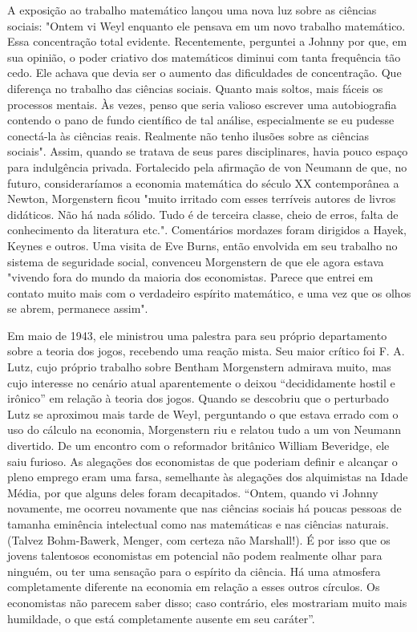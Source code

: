 \documentclass[12pt]{article}
\begin{document}
A exposição ao trabalho matemático lançou uma nova luz sobre as ciências sociais: "Ontem vi Weyl enquanto ele pensava em um novo trabalho matemático. Essa concentração total evidente. Recentemente, perguntei a Johnny por que, em sua opinião, o poder criativo dos matemáticos diminui com tanta frequência tão cedo. Ele achava que devia ser o aumento das dificuldades de concentração. Que diferença no trabalho das ciências sociais. Quanto mais soltos, mais fáceis os processos mentais. Às vezes, penso que seria valioso escrever uma autobiografia contendo o pano de fundo científico de tal análise, especialmente se eu pudesse conectá-la às ciências reais. Realmente não tenho ilusões sobre as ciências sociais". Assim, quando se tratava de seus pares disciplinares, havia pouco espaço para indulgência privada. Fortalecido pela afirmação de von Neumann de que, no futuro, consideraríamos a economia matemática do século XX contemporânea a Newton, Morgenstern ficou "muito irritado com esses terríveis autores de livros didáticos. Não há nada sólido. Tudo é de terceira classe, cheio de erros, falta de conhecimento da literatura etc.". Comentários mordazes foram dirigidos a Hayek, Keynes e outros. Uma visita de Eve Burns, então envolvida em seu trabalho no sistema de seguridade social, convenceu Morgenstern de que ele agora estava "vivendo fora do mundo da maioria dos economistas. Parece que entrei em contato muito mais com o verdadeiro espírito matemático, e uma vez que os olhos se abrem, permanece assim".

Em maio de 1943, ele ministrou uma palestra para seu próprio departamento sobre a teoria dos jogos, recebendo uma reação mista. Seu maior crítico foi F. A. Lutz, cujo próprio trabalho sobre Bentham Morgenstern admirava muito, mas cujo interesse no cenário atual aparentemente o deixou “decididamente hostil e irônico” em relação à teoria dos jogos. Quando se descobriu que o perturbado Lutz se aproximou mais tarde de Weyl, perguntando o que estava errado com o uso do cálculo na economia, Morgenstern riu e relatou tudo a um von Neumann divertido. De um encontro com o reformador britânico William Beveridge, ele saiu furioso. As alegações dos economistas de que poderiam definir e alcançar o pleno emprego eram uma farsa, semelhante às alegações dos alquimistas na Idade Média, por que alguns deles foram decapitados. “Ontem, quando vi Johnny novamente, me ocorreu novamente que nas ciências sociais há poucas pessoas de tamanha eminência intelectual como nas matemáticas e nas ciências naturais. (Talvez Bohm-Bawerk, Menger, com certeza não Marshall!). É por isso que os jovens talentosos economistas em potencial não podem realmente olhar para ninguém, ou ter uma sensação para o espírito da ciência. Há uma atmosfera completamente diferente na economia em relação a esses outros círculos. Os economistas não parecem saber disso; caso contrário, eles mostrariam muito mais humildade, o que está completamente ausente em seu caráter”.
\end{document}
